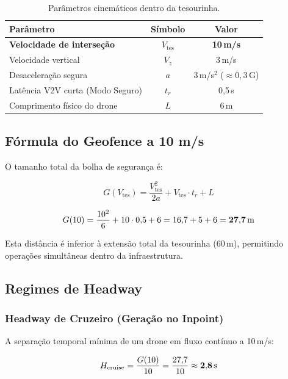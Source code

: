 \documentclass[12pt,a4paper]{article}
\newcommand{\vtes}{V_{\text{tes}}}
\newcommand{\vz}{V_z}
\begin{document}
\begin{table}[H]
\centering
\caption{Parâmetros cinemáticos dentro da tesourinha.}
\label{tab:parametros}
\begin{tabular}{@{}lcc@{}}
\toprule
\textbf{Parâmetro} & \textbf{Símbolo} & \textbf{Valor} \\
\midrule
\textbf{Velocidade de interseção} & $\vtes$  & \textbf{10\,m/s} \\
Velocidade vertical               & $\vz$    & 3\,m/s \\
Desaceleração segura              & $a$      & 3\,m/s$^2$ ($\approx 0{,}3$\,G) \\
Latência V2V curta (Modo Seguro)  & $t_{r}$  & 0{,}5\,s \\
Comprimento físico do drone       & $L$      & 6\,m \\
\bottomrule
\end{tabular}
\end{table}

\subsection{Fórmula do Geofence a 10 m/s}

O tamanho total da bolha de segurança é:

\begin{equation}
G(\vtes) = \frac{\vtes^2}{2a} + \vtes \cdot t_r + L
\label{eq:geofence}
\end{equation}

\begin{equation}
G(10) = \frac{10^2}{6} + 10 \cdot 0{,}5 + 6 = 16{,}7 + 5 + 6 = \mathbf{27{,}7 \text{\,m}}
\label{eq:geofence_tes}
\end{equation}

Esta distância é inferior à extensão total da tesourinha (60\,m), permitindo operações simultâneas dentro da infraestrutura.

\subsection{Regimes de Headway}

\subsubsection{Headway de Cruzeiro (Geração no Inpoint)}

A separação temporal mínima de um drone em fluxo contínuo a 10\,m/s:

\begin{equation}
H_{\text{cruise}} = \frac{G(10)}{10} = \frac{27{,}7}{10} \approx \mathbf{2{,}8 \text{\,s}}
\label{eq:headway_cruise_tes}
\end{equation}
\end{document}
